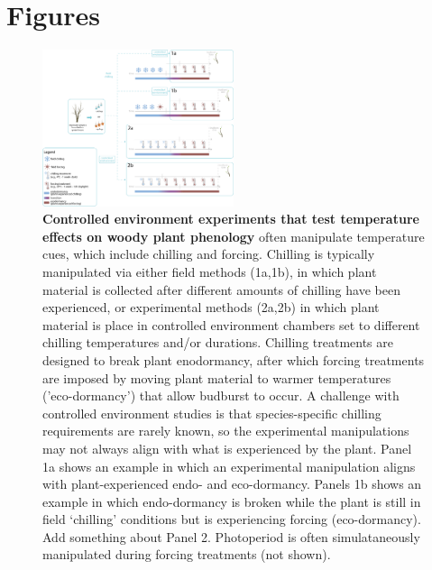 \documentclass{article}
\begin{document}
\section* {Figures}
\begin{figure}[h!]
\centering
\noindent 
\includegraphics[width=0.5\textwidth]{figures/concept/Fig_bbconcept_dormant_V4A.png}

\caption{\textbf{Controlled environment experiments that test temperature effects on woody plant phenology} often manipulate temperature cues, which include chilling and forcing. Chilling is typically manipulated via either field methods (1a,1b), in which plant material is collected after different amounts of chilling have been experienced, or experimental methods  (2a,2b) in which plant material is place in controlled environment chambers set to different chilling temperatures and/or durations. Chilling treatments are designed to break plant enodormancy, after which forcing treatments are imposed by moving plant material to warmer temperatures ('eco-dormancy') that allow budburst to occur. A challenge with controlled environment studies is that species-specific chilling requirements are rarely known, so the experimental manipulations may not always align with what is experienced by the plant. Panel 1a shows an example in which an experimental manipulation  aligns with plant-experienced endo- and eco-dormancy. Panels 1b shows an example in which endo-dormancy is broken while the plant is still in field `chilling' conditions but is experiencing forcing (eco-dormancy). Add something about Panel 2. Photoperiod is often simulataneously manipulated during forcing treatments (not shown).}
\label{fig:concept}
\end{figure}
\end{document}
